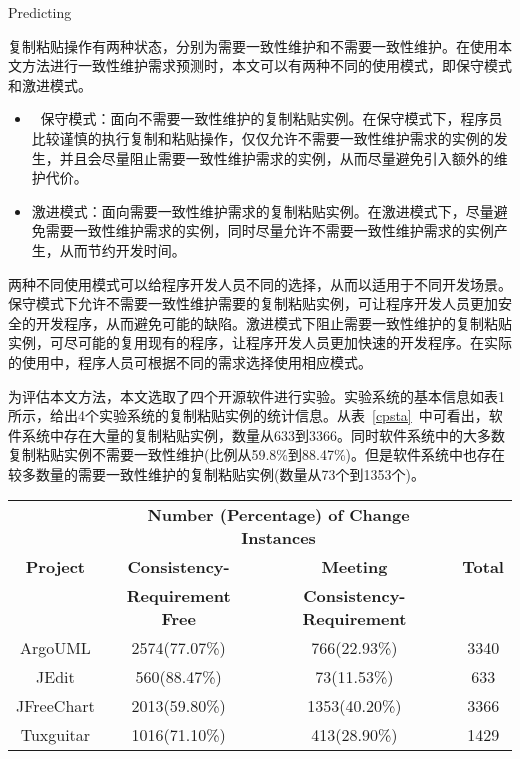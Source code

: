 {Predicting}

复制粘贴操作有两种状态，分别为需要一致性维护和不需要一致性维护。在使用本文方法进行一致性维护需求预测时，本文可以有两种不同的使用模式，即保守模式和激进模式。

\begin{itemize}
\item 	保守模式：面向不需要一致性维护的复制粘贴实例。在保守模式下，程序员比较谨慎的执行复制和粘贴操作，仅仅允许不需要一致性维护需求的实例的发生，并且会尽量阻止需要一致性维护需求的实例，从而尽量避免引入额外的维护代价。
\item        激进模式：面向需要一致性维护需求的复制粘贴实例。在激进模式下，尽量避免需要一致性维护需求的实例，同时尽量允许不需要一致性维护需求的实例产生，从而节约开发时间。
\end{itemize}

两种不同使用模式可以给程序开发人员不同的选择，从而以适用于不同开发场景。保守模式下允许不需要一致性维护需要的复制粘贴实例，可让程序开发人员更加安全的开发程序，从而避免可能的缺陷。激进模式下阻止需要一致性维护的复制粘贴实例，可尽可能的复用现有的程序，让程序开发人员更加快速的开发程序。在实际的使用中，程序人员可根据不同的需求选择使用相应模式。



为评估本文方法，本文选取了四个开源软件进行实验。实验系统的基本信息如表1所示，给出4个实验系统的复制粘贴实例的统计信息。从表~\ref{cpsta}~中可看出，软件系统中存在大量的复制粘贴实例，数量从633到3366。同时软件系统中的大多数复制粘贴实例不需要一致性维护(比例从59.8\%到88.47\%)。但是软件系统中也存在较多数量的需要一致性维护的复制粘贴实例(数量从73个到1353个)。

\begin{table}[htbp]
\vspace{0.5em}\centering\wuhao
\begin{tabular}{cccc}
\toprule[1.5pt]
\multirow{3}{*}{\textbf{Project}}& \multicolumn{2}{c}{\textbf{Number (Percentage) of Change Instances}} & \multirow{3}{*}{\textbf{Total}}\\
  &\textbf{Consistency-} &\textbf{Meeting} &  \\
  &\textbf{Requirement Free}&\textbf{Consistency-Requirement}& \\
\midrule[1pt]
ArgoUML&	2574(77.07\%)&	766(22.93\%)&	3340\\
JEdit&	560(88.47\%)&	73(11.53\%)&	633\\
JFreeChart&	2013(59.80\%)&	1353(40.20\%)&	3366\\
Tuxguitar&	1016(71.10\%)&	413(28.90\%)&	1429\\
\bottomrule[1.5pt]
\end{tabular}
\end{table}

